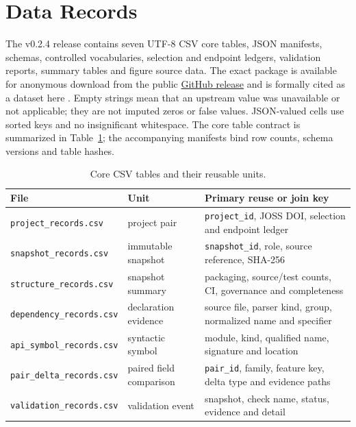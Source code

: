 \documentclass[10pt,a4paper]{article}
\newcommand{\code}[1]{\texttt{#1}}
\begin{document}
\section{Data Records}

The v0.2.4 release contains seven UTF-8 CSV core tables, JSON manifests, schemas, controlled vocabularies, selection and endpoint ledgers, validation reports, summary tables and figure source data. The exact package is available for anonymous download from the public \href{https://github.com/bianyanbo44-afk/reprodecay-scidata/releases/tag/v0.2.4}{GitHub release} and is formally cited as a dataset here \cite{bian2026paired}. Empty strings mean that an upstream value was unavailable or not applicable; they are not imputed zeros or false values. JSON-valued cells use sorted keys and no insignificant whitespace. The core table contract is summarized in Table~\ref{tab:core_tables}; the accompanying manifests bind row counts, schema versions and table hashes.

\begin{table}[H]
\centering
\small
\caption{Core CSV tables and their reusable units.}
\label{tab:core_tables}
\begin{tabularx}{\linewidth}{>{\raggedright\arraybackslash}p{3.75cm} >{\raggedright\arraybackslash}p{1.9cm} X}
\toprule
File & Unit & Primary reuse or join key \\
\midrule
\code{project\_records.csv} & project pair & \code{project\_id}, JOSS DOI, selection and endpoint ledger \\
\code{snapshot\_records.csv} & immutable snapshot & \code{snapshot\_id}, role, source reference, SHA-256 \\
\code{structure\_records.csv} & snapshot summary & packaging, source/test counts, CI, governance and completeness \\
\code{dependency\_records.csv} & declaration evidence & source file, parser kind, group, normalized name and specifier \\
\code{api\_symbol\_records.csv} & syntactic symbol & module, kind, qualified name, signature and location \\
\code{pair\_delta\_records.csv} & paired field comparison & \code{pair\_id}, family, feature key, delta type and evidence paths \\
\code{validation\_records.csv} & validation event & snapshot, check name, status, evidence and detail \\
\bottomrule
\end{tabularx}
\end{table}
\end{document}
